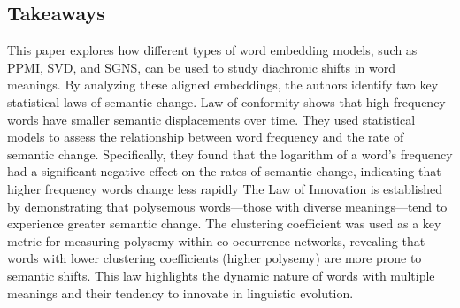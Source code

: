 \subsection{Takeaways}\label{subsec:takeaways4}
This paper explores how different types of word embedding models, such as PPMI, SVD, and SGNS, can be used to study diachronic shifts in word meanings.
By analyzing these aligned embeddings, the authors identify two key statistical laws of semantic change.
Law of conformity shows that high-frequency words have smaller semantic displacements over time.
They used statistical models to assess the relationship between word frequency and the rate of semantic change.
Specifically, they found that the logarithm of a word's frequency had a significant negative effect on the rates of semantic change, indicating that higher frequency words change less rapidly
The Law of Innovation is established by demonstrating that polysemous words—those with diverse meanings—tend to experience greater semantic change.
The clustering coefficient was used as a key metric for measuring polysemy within co-occurrence networks, revealing that words with lower clustering coefficients (higher polysemy) are more prone to semantic shifts.
This law highlights the dynamic nature of words with multiple meanings and their tendency to innovate in linguistic evolution.

